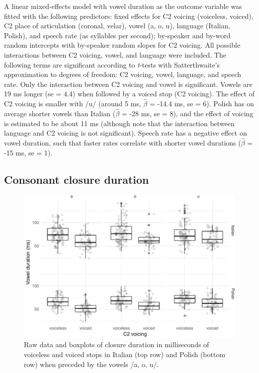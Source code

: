\documentclass[preprint]{JASAnew}
\begin{document}
A linear mixed-effects model with vowel duration as the outcome variable
was fitted with the following predictors: fixed effects for C2 voicing
(voiceless, voiced), C2 place of articulation (coronal, velar), vowel
(a, o, u), language (Italian, Polish), and speech rate (as syllables per
second); by-speaker and by-word random intercepts with by-speaker random
slopes for C2 voicing. All possible interactions between C2 voicing,
vowel, and language were included. The following terms are significant
according to \emph{t}-tests with Satterthwaite's approximation to
degrees of freedom: C2 voicing, vowel, language, and speech rate. Only
the interaction between C2 voicing and vowel is significant. Vowels are
19 ms longer (se = 4.4) when followed by a voiced stop (C2 voicing). The
effect of C2 voicing is smaller with /u/ (around 5 ms, \(\hat{\beta}\) =
-14.4 ms, se = 6). Polish has on average shorter vowels than Italian
(\(\hat{\beta}\) = -28 ms, se = 8), and the effect of voicing is
estimated to be about 11 ms (although note that the interaction between
language and C2 voicing is not significant). Speech rate has a negative
effect on vowel duration, such that faster rates correlate with shorter
vowel durations (\(\hat{\beta}\) = -15 ms, se = 1).

\subsection{Consonant closure
duration}\label{consonant-closure-duration}

\begin{figure}
\includegraphics[width=\linewidth]{2018-jasa_files/figure-latex/Figure3-1} \caption{Raw data and boxplots of closure duration in milliseconds of voiceless and voiced stops in Italian (top row) and Polish (bottom row) when preceded by the vowels /a, o, u/.}\label{f:Figure3}
\end{figure}
\end{document}
